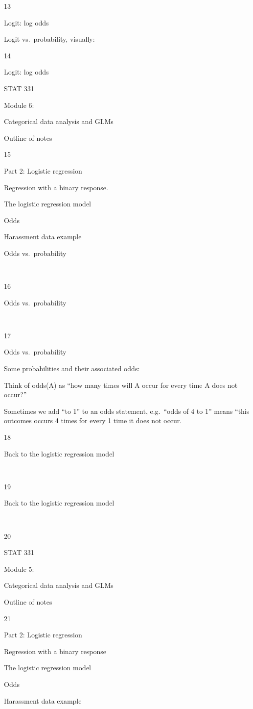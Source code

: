 \documentclass[
  letterpaper,
  DIV=11,
  numbers=noendperiod]{scrreprt}
\begin{document}
13

Logit: log odds

Logit vs.~probability, visually:

14

Logit: log odds

STAT 331

Module 6:

Categorical data analysis and GLMs

Outline of notes

15

Part 2: Logistic regression

Regression with a binary response.

The logistic regression model

Odds

Harassment data example

Odds vs.~probability

~

16

Odds vs.~probability

~

17

Odds vs.~probability

Some probabilities and their associated odds:

Think of odds(A) as ``how many times will A occur for every time A does
not occur?''

Sometimes we add ``to 1'' to an odds statement, e.g.~``odds of 4 to 1''
means ``this outcomes occurs 4 times for every 1 time it does not occur.

18

Back to the logistic regression model

~

19

Back to the logistic regression model

~

20

STAT 331

Module 5:

Categorical data analysis and GLMs

Outline of notes

21

Part 2: Logistic regression

Regression with a binary response

The logistic regression model

Odds

Harassment data example
\end{document}
